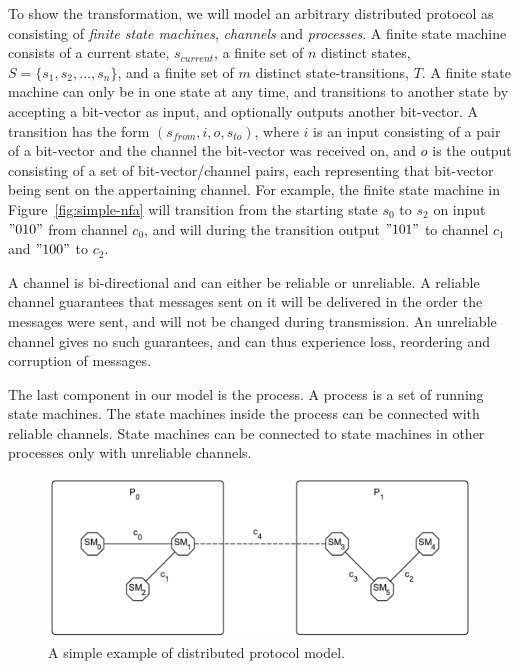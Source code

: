 \documentclass{article}
\begin{document}
	To show the transformation, we will model an arbitrary distributed protocol as consisting of \textit{finite state machines}, \textit{channels} and \textit{processes}.
	A finite state machine consists of a current state, $s_{current}$, a finite set of $n$ distinct states, $S=\{s_1, s_2, \dots, s_n\}$, and a finite set of $m$ distinct state-transitions, $T$.
	A finite state machine can only be in one state at any time, and transitions to another state by accepting a bit-vector as input, and optionally outputs another bit-vector.
	A transition has the form $(s_{from}, i, o, s_{to})$, where $i$ is an input consisting of a pair of a bit-vector and the channel the bit-vector was received on, and $o$ is the output consisting of a set of bit-vector/channel pairs, each representing that bit-vector being sent on the appertaining channel.
	For example, the finite state machine in Figure~\ref{fig:simple-nfa} will transition from the starting state $s_0$ to $s_2$ on input $"010"$ from channel $c_0$, and will during the transition output $"101"$ to channel $c_1$ and $"100"$ to $c_2$.

	A channel is bi-directional and can either be reliable or unreliable.
	A reliable channel guarantees that messages sent on it will be delivered in the order the messages were sent, and will not be changed during transmission.
	An unreliable channel gives no such guarantees, and can thus experience loss, reordering and corruption of messages.

	The last component in our model is the process.
	A process is a set of running state machines.
	The state machines inside the process can be connected with reliable channels.
	State machines can be connected to state machines in other processes only with unreliable channels.

	\begin{figure}[ht]
		\center
		\includegraphics[scale=0.6]{figures/state-machines/Distributed-protocol-model.pdf}
		\caption{A simple example of distributed protocol model.\label{fig:simple-model}}
	\end{figure}
\end{document}
